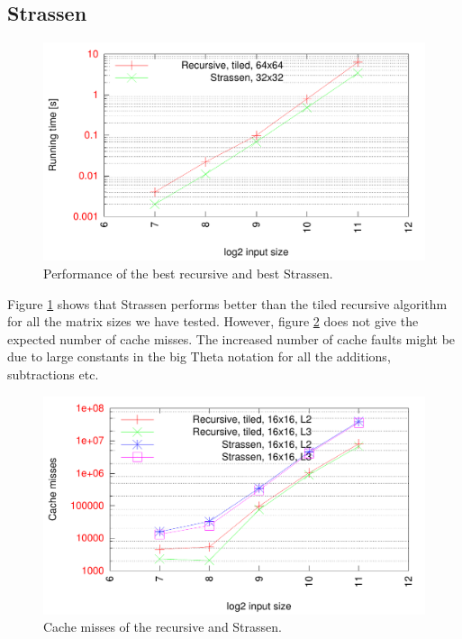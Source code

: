 \subsection{Strassen}


\begin{figure}[h!]
  \centering
  \includegraphics[width=\textwidth]{"../project2/gnuplots/recursive_vs_strassen_performance"}
  \caption{Performance of the best recursive and best Strassen.}
  \label{fig:recursive_vs_strassen_performance}
\end{figure}

Figure \ref{fig:recursive_vs_strassen_performance} shows that Strassen performs better than the tiled recursive algorithm for all the matrix sizes we have tested. However, figure \ref{fig:recursive_vs_strassen_cache} does not give the expected number of cache misses. The increased number of cache faults might be due to large constants in the big Theta notation for all the additions, subtractions etc.

\begin{figure}[h!]
  \centering
  \includegraphics[width=\textwidth]{"../project2/gnuplots/recursive_vs_strassen_cache"}
  \caption{Cache misses of the recursive and Strassen.}
  \label{fig:recursive_vs_strassen_cache}
\end{figure}

